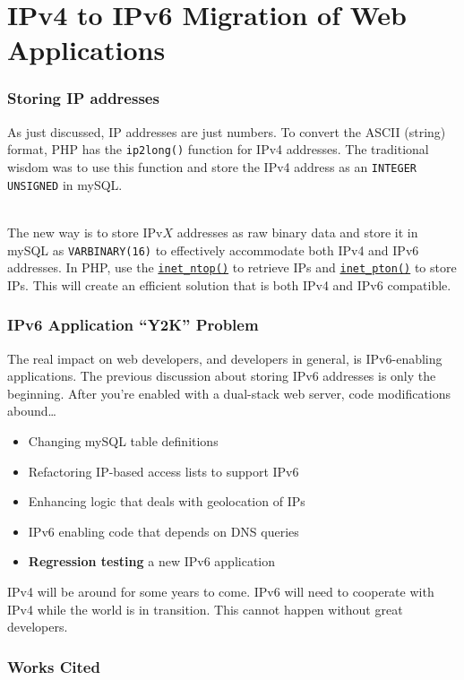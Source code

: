 \documentclass[aspectratio=169]{beamer}
\begin{document}
\section{IPv4 to IPv6 Migration of Web Applications}
\begin{frame}
\frametitle{Storing IP addresses}
As just discussed, IP addresses are just numbers. To convert the ASCII (string) format, PHP has the \texttt{ip2long()} function for IPv4 addresses. The traditional wisdom was to use this function and store the IPv4 address as an \texttt{INTEGER UNSIGNED} in mySQL.

\pause
\mbox{}\\
The new way is to store IPv$X$ addresses as raw binary data and store it in mySQL as \texttt{VARBINARY(16)} to effectively accommodate both IPv4 and IPv6 addresses. In PHP, use the \href{http://www.php.net/manual/en/function.inet-ntop.php}{\texttt{inet\_ntop()}} to retrieve IPs and \href{http://www.php.net/manual/en/function.inet-pton.php}{\texttt{inet\_pton()}} to store IPs. This will create an efficient solution that is both IPv4 and IPv6 compatible.
\end{frame}

\begin{frame}
\frametitle{IPv6 Application ``Y2K'' Problem}
The real impact on web developers, and developers in general, is IPv6-enabling applications. The previous discussion about storing IPv6 addresses is only the beginning. After you're enabled with a dual-stack web server, code modifications abound\dots
\begin{itemize}
	\item Changing mySQL table definitions
	\item Refactoring IP-based access lists to support IPv6
	\item Enhancing logic that deals with geolocation of IPs
	\item IPv6 enabling code that depends on DNS queries
	\item \textbf{Regression testing} a new IPv6 application
\end{itemize}
IPv4 will be around for some years to come. IPv6 will need to cooperate with IPv4 while the world is in transition. This cannot happen without great developers.
\end{frame}

\begin{frame}
\frametitle{Works Cited}

\end{frame}
\end{document}
